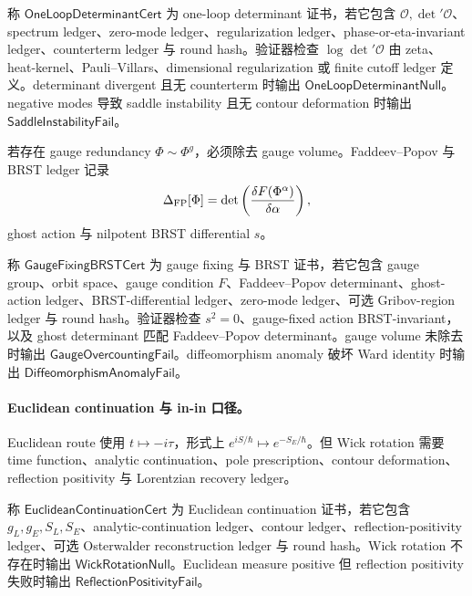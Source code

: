 \begin{definition}\label{def:typed-address-biaxial-completion-one-loop-determinant-cert}
称 \(\mathsf{OneLoopDeterminantCert}\) 为 one-loop determinant 证书，若它包含 \(\mathcal O,\det{}'\mathcal O\)、spectrum ledger、zero-mode ledger、regularization ledger、phase-or-eta-invariant ledger、counterterm ledger 与 round hash。验证器检查 \(\log\det{}'\mathcal O\) 由 zeta、heat-kernel、Pauli--Villars、dimensional regularization 或 finite cutoff ledger 定义。determinant divergent 且无 counterterm 时输出 \(\mathsf{OneLoopDeterminantNull}\)。negative modes 导致 saddle instability 且无 contour deformation 时输出 \(\mathsf{SaddleInstabilityFail}\)。
\end{definition}

若存在 gauge redundancy \(\Phi\sim\Phi^g\)，必须除去 gauge volume。Faddeev--Popov 与 BRST ledger 记录
\[
\Delta_{\rm FP}[\Phi]
=
\det\left(\frac{\delta F(\Phi^\alpha)}{\delta\alpha}\right),
\]
ghost action 与 nilpotent BRST differential \(s\)。

\begin{definition}\label{def:typed-address-biaxial-completion-gauge-fixing-brst-cert}
称 \(\mathsf{GaugeFixingBRSTCert}\) 为 gauge fixing 与 BRST 证书，若它包含 gauge group、orbit space、gauge condition \(F\)、Faddeev--Popov determinant、ghost-action ledger、BRST-differential ledger、zero-mode ledger、可选 Gribov-region ledger 与 round hash。验证器检查 \(s^2=0\)、gauge-fixed action BRST-invariant，以及 ghost determinant 匹配 Faddeev--Popov determinant。gauge volume 未除去时输出 \(\mathsf{GaugeOvercountingFail}\)。diffeomorphism anomaly 破坏 Ward identity 时输出 \(\mathsf{DiffeomorphismAnomalyFail}\)。
\end{definition}

\paragraph{Euclidean continuation 与 in-in 口径。}
Euclidean route 使用 \(t\mapsto-i\tau\)，形式上 \(e^{iS/\hbar}\mapsto e^{-S_E/\hbar}\)。但 Wick rotation 需要 time function、analytic continuation、pole prescription、contour deformation、reflection positivity 与 Lorentzian recovery ledger。

\begin{definition}\label{def:typed-address-biaxial-completion-euclidean-continuation-cert}
称 \(\mathsf{EuclideanContinuationCert}\) 为 Euclidean continuation 证书，若它包含 \(g_L,g_E,S_L,S_E\)、analytic-continuation ledger、contour ledger、reflection-positivity ledger、可选 Osterwalder reconstruction ledger 与 round hash。Wick rotation 不存在时输出 \(\mathsf{WickRotationNull}\)。Euclidean measure positive 但 reflection positivity 失败时输出 \(\mathsf{ReflectionPositivityFail}\)。
\end{definition}

